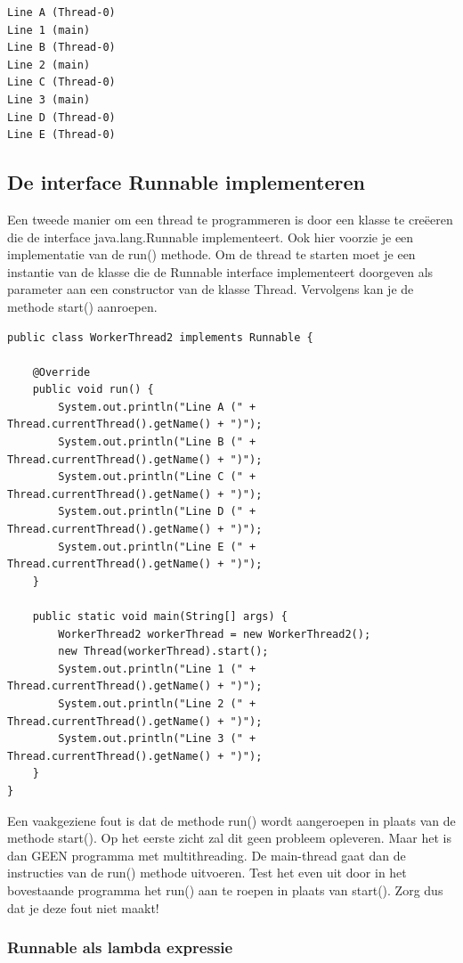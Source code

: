 \documentclass{tstextbook}
\begin{document}
\begin{verbatim}
Line A (Thread-0)
Line 1 (main)
Line B (Thread-0)
Line 2 (main)
Line C (Thread-0)
Line 3 (main)
Line D (Thread-0)
Line E (Thread-0)
\end{verbatim}

\subsection{De interface Runnable implementeren}

Een tweede manier om een thread te programmeren is door een klasse te cre\"eeren die de interface java.lang.Runnable implementeert. Ook hier voorzie je een implementatie van de run() methode. 
Om de thread te starten moet je een instantie van de klasse die de Runnable interface implementeert doorgeven als parameter aan een constructor van de klasse Thread. Vervolgens kan je de methode start() aanroepen.

\begin{lstlisting}
public class WorkerThread2 implements Runnable {

	@Override
	public void run() {
		System.out.println("Line A (" + Thread.currentThread().getName() + ")");
		System.out.println("Line B (" + Thread.currentThread().getName() + ")");
		System.out.println("Line C (" + Thread.currentThread().getName() + ")");
		System.out.println("Line D (" + Thread.currentThread().getName() + ")");
		System.out.println("Line E (" + Thread.currentThread().getName() + ")");
	}

	public static void main(String[] args) {
		WorkerThread2 workerThread = new WorkerThread2();
		new Thread(workerThread).start();
		System.out.println("Line 1 (" + Thread.currentThread().getName() + ")");
		System.out.println("Line 2 (" + Thread.currentThread().getName() + ")");
		System.out.println("Line 3 (" + Thread.currentThread().getName() + ")");
	}
}
\end{lstlisting}

Een vaakgeziene fout is dat de methode run() wordt aangeroepen in plaats van de methode start(). Op het eerste zicht zal dit geen probleem opleveren. Maar het is dan GEEN programma met multithreading. De main-thread gaat dan de instructies van de run() methode uitvoeren. Test het even uit door in het bovestaande programma het run() aan te roepen in plaats van start(). Zorg dus dat je deze fout niet maakt!

\subsubsection{Runnable als lambda expressie}
\end{document}
